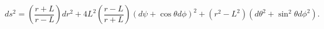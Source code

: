 \begin{equation}
ds^2=\left(\frac{r + L}{r - L}\right) dr^{2}+4 L^{2}\left(\frac{r -
L}{r + L}\right) (d\psi+\cos \theta
d\phi)^{2}+(r^{2}-L^{2})(d\theta^{2}+\sin^{2}\theta
d\phi^{2})\label{TN}.
\end{equation}

